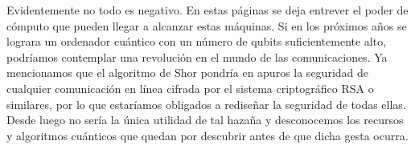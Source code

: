 Evidentemente no todo es negativo. En estas páginas se deja entrever el poder de cómputo que pueden llegar a alcanzar estas máquinas. Si en los próximos años se lograra un ordenador cuántico con un número de qubits suficientemente alto, podríamos contemplar una revolución en el mundo de las comunicaciones. Ya mencionamos que el algoritmo de Shor pondría en apuros la seguridad de cualquier comunicación en línea cifrada por el sistema criptográfico RSA o similares, por lo que estaríamos obligados a rediseñar la seguridad de todas ellas. Desde luego no sería la única utilidad de tal hazaña y desconocemos los recursos y algoritmos cuánticos que quedan por descubrir antes de que dicha gesta ocurra.
